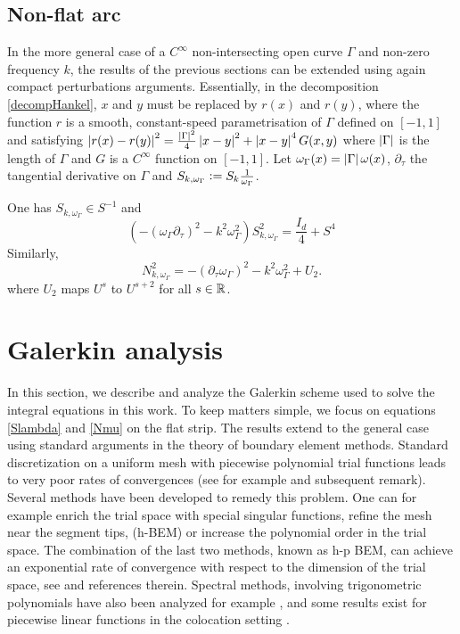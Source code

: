 \documentclass[a4paper]{article}
\begin{document}
\subsection{Non-flat arc}

In the more general case of a $C^{\infty}$ non-intersecting open curve $\Gamma$ and non-zero frequency $k$, the results of the previous sections can be extended using again compact perturbations arguments. Essentially, in the decomposition \autoref{decompHankel}, $x$ and $y$ must be replaced by $r(x)$ and $r(y)$, where the function $r$ is a smooth, constant-speed parametrisation of $\Gamma$ defined on $[-1,1]$ and satisfying $\left\lvert r(x) - r(y) \right\rvert^2 = \frac{\left\lvert \Gamma \right\rvert^2}{4} \left\lvert x - y \right\rvert^2 + \left\lvert x-y \right\rvert^4 G(x,y)$ where $\left\lvert \Gamma \right\rvert$ is the length of $\Gamma$ and $G$ is a $C^{\infty}$ function on $[-1,1]$. Let $\omega_\Gamma(x) = \left\lvert \Gamma \right\rvert \omega(x)$, $\partial_\tau$ the tangential derivative on $\Gamma$ and $S_{k,\omega_{\Gamma}} \mathrel{\mathop:}= S_k \frac{1}{\omega_\Gamma}$.
\begin{The}
	\label{TheHelmholtz3}
	One has $S_{k,\omega_\Gamma} \in S^{-1}$ and
	\[\left( -(\omega_\Gamma \partial_\tau)^2 - k^2\omega_\Gamma^2\right) S_{k,\omega_\Gamma}^2= \frac{I_d}{4} + S^4\]
	Similarly, 
	\[N_{k,\omega_\Gamma}^2 =  -(\partial_\tau \omega_\Gamma)^2 - k^2\omega_\Gamma^2 + U_2.\]
	where $U_2$ maps $U^s$ to $U^{s+2}$ for all $s \in \mathbb{R}$. 
\end{The}

\section{Galerkin analysis}

\label{subsec:GalerkineSetting}

In this section, we describe and analyze the Galerkin scheme used to solve the integral equations in this work. To keep matters simple, we focus on equations \eqref{Slambda} and \eqref{Nmu} on the flat strip. The results extend to the general case using standard arguments in the theory of boundary element methods. Standard discretization on a uniform mesh with piecewise polynomial trial functions leads to very poor rates of convergences (see for example \cite[Chap. 4, ]{sauter2011boundary} and subsequent remark). Several methods have been developed to remedy this problem. One can for example enrich the trial space with special singular functions, refine the mesh near the segment tips, (h-BEM) or increase the polynomial order in the trial space. The combination of the last two methods, known as h-p BEM, can achieve an exponential rate of convergence with respect to the dimension of the trial space, see \cite{postell1990h} and references therein. Spectral methods, involving trigonometric polynomials have also been analyzed for example \cite{bruno2012second}, and some results exist for piecewise linear functions in the colocation setting \cite{costabel1988convergence}. 
\end{document}
